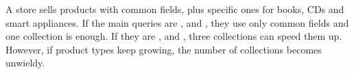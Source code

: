 \begin{example}
A store sells products with common fields, plus specific ones for books, CDs and smart appliances. If the main queries are ,  and , they use only common fields and one collection is enough. If they are ,  and , three collections can speed them up. However, if product types keep growing, the number of collections becomes unwieldy.
\end{example}
